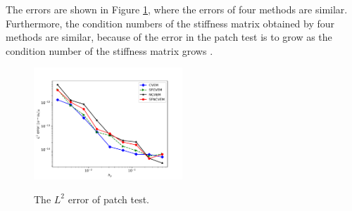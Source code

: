 \documentclass[10pt]{amsart}
\theoremstyle{definition}
\theoremstyle{remark}
\begin{document}
\begin{enumerate}[1.]
The errors are shown in Figure \ref{fig:patchtest}, where 
the errors of four methods are similar. 
Furthermore, 
the condition numbers of the stiffness matrix obtained by
four methods are similar, because of the error in the patch test is to
grow as the condition number of the stiffness matrix grows
\cite{DassiMascotto2018}.

\begin{figure}[h]
\centering
{}
\includegraphics[width=2.2in]{../figures/patch_test_hy.pdf}
  \label{fig:patchtest} %
\caption{The $L^2$ error of patch test.}
\end{figure}

















 
\end{enumerate}
\end{document}
